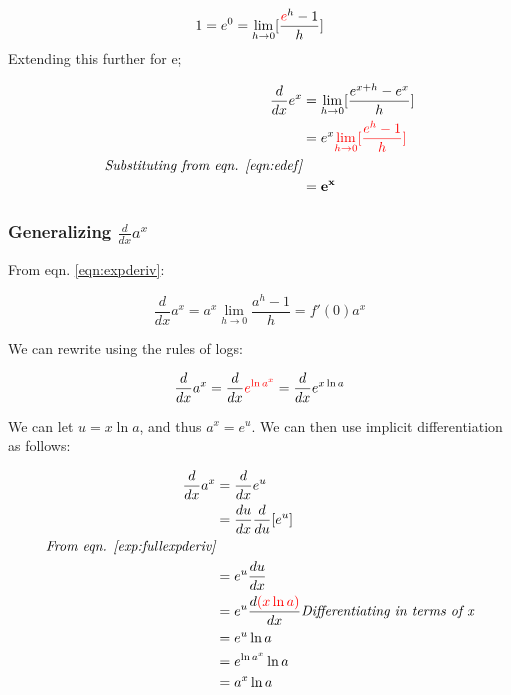 \documentclass[12pt]{article}
\begin{document}
\begin{equation}\label{eqn:edef}
    \begin{split}
        1 = e^0 = \lim_{h\to 0}[\frac{\textcolor{red}{e}^h-1}{h}]
    \end{split}
\end{equation}
Extending this further for e;

\begin{equation}\label{exp:fullexpderiv}
    \begin{split}
        \frac{d}{dx} e^x &= \lim_{h\to 0}[\frac{e^{x+h}-e^x}{h}]\\
        &= e^x \textcolor{red}{\lim_{h\to 0}[\frac{e^h-1}{h}]}\\
        \textit{Substituting from eqn. \ref{eqn:edef}}\\
        &= \mathbf{e^x}
    \end{split}
\end{equation}

\subsubsection{Generalizing \texorpdfstring{$\frac{d}{dx} a^x$}{TEXT}}

From eqn. \ref{eqn:expderiv}:

$$\frac{d}{dx}a^x = a^x \lim_{h\to 0} \frac{a^h-1}{h} = f'(0) a^x$$

We can rewrite using the rules of logs:

$$\frac{d}{dx}a^x = \frac{d}{dx}\textcolor{red}{ e^{\ln a^x} } = \frac{d}{dx} e^{x\ln a}$$

We can let $u = x \ln a$, and thus $a^x = e^u$. We can then use implicit differentiation as follows:

\begin{equation}\label{exp:derivativeexpa}
    \begin{split}
        \frac{d}{dx} a^x &= \frac{d}{dx} e^u\\
        &=\frac{du}{dx} \frac{d}{du} [e^u]\\
        \textit{From eqn. \ref{exp:fullexpderiv}}\\
        &=e^u \frac{du}{dx}\\
        &= e^u \frac{d \textcolor{red}{(x \ln a)}}{dx}
        \textit{Differentiating in terms of x}\\
        &= e^u \ln a\\
        &= e^{\ln a^x} \ln a\\
        &= a^x \ln a\\
    \end{split}
\end{equation}
\end{document}
